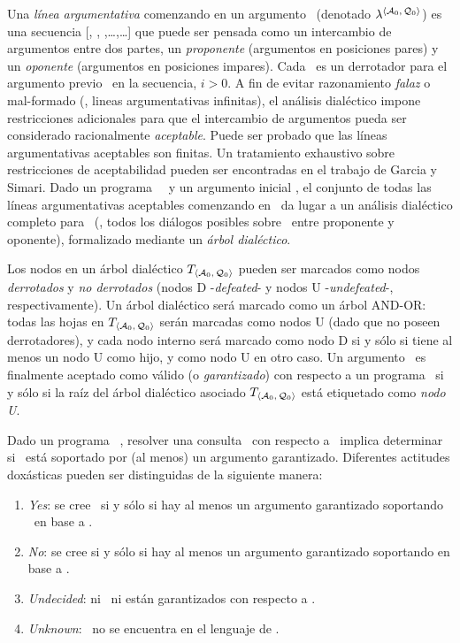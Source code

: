 Una \textit{línea argumentativa} comenzando en un argumento \AoQo\ (denotado $\lambda^{\scriptsize \mbox{$\langle \mbox{${\mathcal A_0}$},\mbox{${\mathcal Q_0}$} \rangle $}}$)
es una secuencia [\AoQo, \AaQa, \AbQb,\ldots,\AnQn\ldots] que puede ser pensada como un intercambio de 
argumentos entre dos partes, un \textit{proponente} (argumentos en posiciones pares) y un \textit{oponente} (argumentos en posiciones impares). Cada \AiQi\ es un derrotador para el argumento previo \AimQim\ en la secuencia, $i > 0$.
A fin de evitar razonamiento \textit{falaz} o mal-formado (\eg , lineas argumentativas infinitas), el 
análisis dialéctico impone restricciones adicionales para que el intercambio de argumentos pueda ser 
considerado racionalmente \textit{aceptable}. Puede ser probado que las líneas argumentativas aceptables 
son finitas. Un tratamiento exhaustivo sobre restricciones de aceptabilidad pueden ser encontradas en el
trabajo de Garcia y Simari. %
Dado un programa \DLP\ \PP\ y un argumento inicial \AoQo, el conjunto de todas las líneas argumentativas
aceptables comenzando en \AoQo\ da lugar a un análisis dialéctico completo para \AoQo\ (\ie, todos los
diálogos posibles sobre \AoQo\ entre proponente y oponente), formalizado mediante un \textit{árbol dialéctico}.

Los nodos en un árbol dialéctico $T_{\scriptsize \mbox{$\langle \mbox{${\mathcal A_0}$},\mbox{${\mathcal Q_0}$} \rangle $}}$ pueden ser marcados como nodos \textit{derrotados} 
y \textit{no derrotados} (nodos D -\textit{defeated}- y nodos U -\textit{undefeated}-, respectivamente). 
Un árbol dialéctico será marcado como un árbol {\footnotesize AND-OR}: todas las hojas en 
$T_{\scriptsize \mbox{$\langle \mbox{${\mathcal A_0}$},\mbox{${\mathcal Q_0}$} \rangle $}}$ serán marcadas como nodos U (dado que no poseen derrotadores), y cada nodo interno 
será marcado como nodo D si y sólo si tiene al menos un nodo U como hijo, y como nodo U en otro caso. 
Un argumento \AoQo\ es finalmente aceptado como válido (o \textit{garantizado}) con respecto a un programa 
\DLP\ \PP si y sólo si la raíz del árbol dialéctico asociado $T_{\scriptsize \mbox{$\langle \mbox{${\mathcal A_0}$},\mbox{${\mathcal Q_0}$} \rangle $}}$ está etiquetado como \textit{nodo U}. %

Dado un programa \DLP\ \PP, resolver una consulta \ArgQ\ con respecto a \PP\ implica determinar si \ArgQ\ está soportado por (al menos) un argumento garantizado. Diferentes actitudes doxásticas %
pueden ser distinguidas de la siguiente manera:

\begin{enumerate}[(1)]
	\item \textit{Yes}: se cree \ArgQ\ si y sólo si hay al menos un argumento garantizado soportando
		\ArgQ\ en base a \PP.
	\item \textit{No}: se cree \lit{\no \ArgQ} si y sólo si hay al menos un argumento garantizado 
		soportando \lit{\no \ArgQ} en base a \PP.
	\item \textit{Undecided}: ni \ArgQ\ ni \lit{\no \ArgQ} están garantizados con respecto a \PP.
	\item \textit{Unknown}: \ArgQ\ no se encuentra en el lenguaje de \PP.
\end{enumerate}
